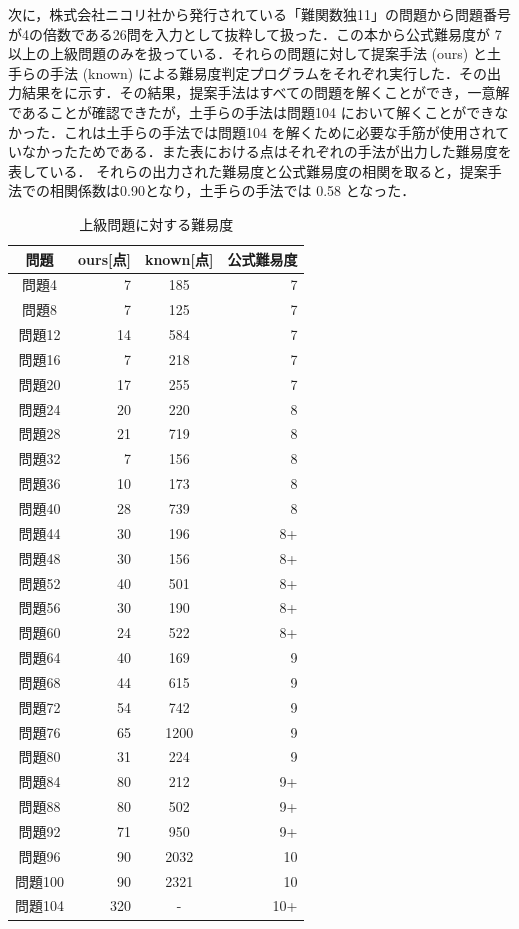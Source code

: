 \documentclass[submit,techrep,noauthor]{ipsj}
\begin{document}
次に，株式会社ニコリ社から発行されている「難関数独11」の問題から問題番号が4の倍数である26問を入力として抜粋して扱った\cite{難関数独11}．この本から公式難易度が 7 以上の上級問題のみを扱っている．それらの問題に対して提案手法 (ours) と土手らの手法 (known) による難易度判定プログラムをそれぞれ実行した．その出力結果をに示す．その結果，提案手法はすべての問題を解くことができ，一意解であることが確認できたが，土手らの手法は問題104 において解くことができなかった．これは土手らの手法では問題104 を解くために必要な手筋が使用されていなかったためである．また表における点はそれぞれの手法が出力した難易度を表している．
それらの出力された難易度と公式難易度の相関を取ると，提案手法での相関係数は0.90となり，土手らの手法では 0.58 となった．

	\begin{table}[tb]
		\caption{上級問題に対する難易度}
		\label{study_hard}
			\begin{tabular}{crcr}
			\hline\hline
			問題 & ours[点] & known[点] & 公式難易度\\
			\hline
問題4 & 7 & 185 & 7\\
問題8 & 7 & 125 & 7\\
問題12 & 14 & 584 & 7\\
問題16 & 7 & 218 & 7\\
問題20 & 17 & 255 & 7\\
問題24 & 20 & 220 & 8\\
問題28 & 21 & 719 & 8\\
問題32 & 7 & 156 & 8\\
問題36 & 10 & 173 & 8\\
問題40 & 28 & 739 & 8\\
問題44 & 30 & 196 & 8+\\
問題48 & 30 & 156 & 8+\\
問題52 & 40 & 501 & 8+\\
問題56 & 30 & 190 & 8+\\
問題60 & 24 & 522 & 8+\\
問題64 & 40 & 169 & 9\\
問題68 & 44 & 615 & 9\\
問題72 & 54 & 742 & 9\\
問題76 & 65 & 1200 & 9\\
問題80 & 31 & 224 & 9\\
問題84 & 80 & 212 & 9+\\
問題88 & 80 & 502 & 9+\\
問題92 & 71 & 950 & 9+\\
問題96 & 90 & 2032 & 10\\
問題100 & 90 & 2321 & 10\\
問題104 & 320 & - & 10+\\
			\hline
	 	\end{tabular}
	\end{table}
\end{document}
